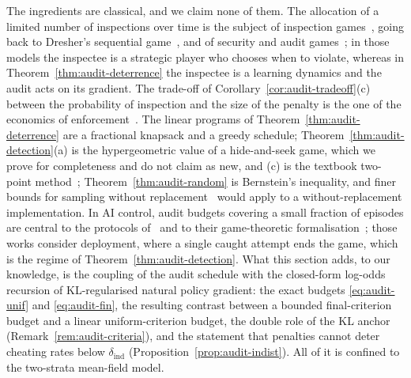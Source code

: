 \begin{remark}\label{rem:audit-related}
The ingredients are classical, and we claim none of them. The allocation of a
limited number of inspections over time is the subject of inspection
games~\cite{avenhaus2002inspection}, going back to Dresher's sequential
game~\cite{dresher1962sampling}, and of security and audit
games~\cite{tambe2011security,blocki2013audit}; in those models the inspectee is
a strategic player who chooses when to violate, whereas in
Theorem~\ref{thm:audit-deterrence} the inspectee is a learning dynamics and the
audit acts on its gradient. The trade-off of
Corollary~\ref{cor:audit-tradeoff}(c) between the probability of inspection and
the size of the penalty is the one of the economics of
enforcement~\cite{becker1968crime}. The linear programs of
Theorem~\ref{thm:audit-deterrence} are a fractional knapsack and a greedy
schedule; Theorem~\ref{thm:audit-detection}(a) is the hypergeometric value of a
hide-and-seek game, which we prove for completeness and do not claim as new,
and (c) is the textbook two-point method~\cite{lecam1973convergence,yu1997assouad};
Theorem~\ref{thm:audit-random} is Bernstein's inequality, and finer bounds for
sampling without replacement~\cite{hoeffding1963probability,serfling1974probability}
would apply to a without-replacement implementation. In AI control, audit
budgets covering a small fraction of episodes are central to the protocols
of~\cite{greenblatt2023control} and to their game-theoretic
formalisation~\cite{griffin2024games}; those works consider deployment, where a
single caught attempt ends the game, which is the regime of
Theorem~\ref{thm:audit-detection}. What this section adds, to our knowledge, is
the coupling of the audit schedule with the closed-form log-odds recursion of
KL-regularised natural policy gradient: the exact budgets
\eqref{eq:audit-unif} and \eqref{eq:audit-fin}, the resulting contrast between
a bounded final-criterion budget and a linear uniform-criterion budget, the
double role of the KL anchor (Remark~\ref{rem:audit-criteria}), and the
statement that penalties cannot deter cheating rates below
$\delta_{\mathrm{ind}}$ (Proposition~\ref{prop:audit-indist}). All of it is
confined to the two-strata mean-field model.
\end{remark}

